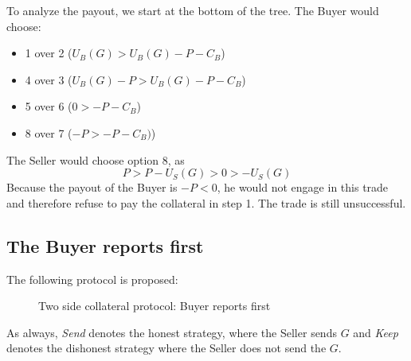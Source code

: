 \documentclass{cacthesis}
\begin{document}
To analyze the payout, we start at the bottom of the tree. The Buyer would choose:
\begin{itemize}
    \item 1 over 2 ($U_B(G) > U_B(G) -P -C_B$)
    \item 4 over 3 ($U_B(G) - P > U_B(G) -P -C_B$)
    \item 5 over 6 ($0 > -P -C_B$)
    \item 8 over 7 ($-P > -P -C_B)$)
\end{itemize}
The Seller would choose option 8, as 
\[P>P-U_S(G)>0>-U_S(G)\]
Because the payout of the Buyer is $-P<0$, he would not engage in this trade and therefore refuse to pay the collateral in step 1. The trade is still unsuccessful.

\subsection{The Buyer reports first}
The following protocol is proposed:
\begin{figure}[htb!]
    \centering
    \caption{Two side collateral protocol: Buyer reports first}
    \label{pro:two-side-collateral-buyer-first}
\end{figure}

As always, \emph{Send} denotes the honest strategy, where the Seller sends $G$ and \emph{Keep} denotes the dishonest strategy where the Seller does not send the $G$.
\end{document}
